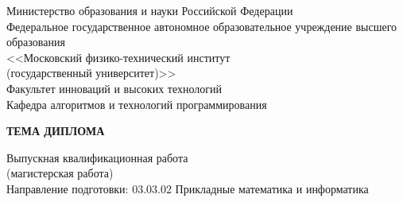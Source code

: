 \thispagestyle{empty}%
\begin{center}%
\small{Министерство образования и науки Российской Федерации}\\
Федеральное государственное автономное образовательное учреждение высшего\\
образования\\
<<Московский физико-технический институт\\
(государственный университет)>>\\
\normalsize {Факультет инноваций и высоких технологий}\\
\small{Кафедра алгоритмов и технологий программирования}
\end{center}%
%
%
%
\vspace{0pt plus3fill} %
%
\vspace{0pt plus1fill} %
\begin{center}%
\textbf {\large \MakeUppercase{Тема диплома}}

\vspace{0pt plus1fill} %
{%
Выпускная квалификационная работа\\
(магистерская работа)\\
}
\vspace{0pt plus1fill}
{
Направление подготовки: 03.03.02 Прикладные математика и информатика
}

\end{center}%
